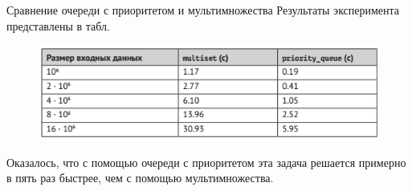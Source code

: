 \documentclass{beamer}
\begin{document}
\begin{frame}[fragile]{Сравнение очереди с приоритетом и мультимножества}
    Результаты эксперимента представлены в табл.
    
    \begin{figure}[h]
		\centering
		\includegraphics[scale=0.75]{images/lec11-pic04.png}
	\end{figure}

    Оказалось, что с помощью очереди с приоритетом эта задача решается примерно в пять раз быстрее, чем с помощью мультимножества.
\end{frame}
\end{document}
